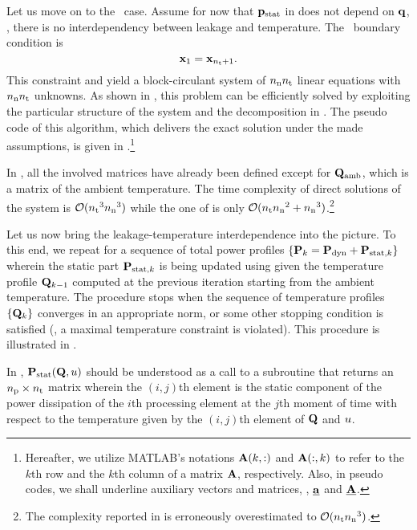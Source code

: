 Let us move on to the \dss\ case.
Assume for now that $\mathbf{p}_{\text{stat}}$ in  does not depend on $\mathbf{q}$, \ie, there is no interdependency between leakage and temperature.
The \dss\ boundary condition is
\[
  \mathbf{x}_1 = \mathbf{x}_{{n_\text{t}} + 1}.
\]
This constraint and  yield a block-circulant system of ${n_\text{n}} {n_\text{t}}$ linear equations with ${n_\text{n}} {n_\text{t}}$ unknowns.
As shown in \cite{ukhov2012}, this problem can be efficiently solved by exploiting the particular structure of the system and the decomposition in .
The pseudo code of this algorithm, which delivers the exact solution under the made assumptions, is given in .\footnote{Hereafter, we utilize MATLAB's notations $\mathbf{A}(k, :)$ and $\mathbf{A}(:, k)$ to refer to the $k$th row and the $k$th column of a matrix $\mathbf{A}$, respectively.
Also, in pseudo codes, we shall underline auxiliary vectors and matrices, \eg, $\underline{\mathbf{a}}$ and $\underline{\mathbf{A}}$.}


In , all the involved matrices have already been defined except for $\mathbf{Q}_{\text{amb}}$, which is a matrix of the ambient temperature.
The time complexity of direct solutions of the system is $\mathcal{O}({n_\text{t}}^3 {n_\text{n}}^3)$ while the one of  is only $\mathcal{O}({n_\text{t}} {n_\text{n}}^2 + {n_\text{n}}^3)$.\footnote{The complexity reported in \cite{ukhov2012} is erroneously overestimated to $\mathcal{O}({n_\text{t}} {n_\text{n}}^3)$.}

Let us now bring the leakage-temperature interdependence into the picture.
To this end, we repeat  for a sequence of total power profiles $\{ \mathbf{P}_k = \mathbf{P}_{\text{dyn}} + \mathbf{P}_{\text{stat}, k} \}$ wherein the static part $\mathbf{P}_{\text{stat}, k}$ is being updated using  given the temperature profile $\mathbf{Q}_{k - 1}$ computed at the previous iteration starting from the ambient temperature.
The procedure stops when the sequence of temperature profiles $\{ \mathbf{Q}_k \}$ converges in an appropriate norm, or some other stopping condition is satisfied (\eg, a maximal temperature constraint is violated).
This procedure is illustrated in .


In , $\mathbf{P}_{\text{stat}}(\mathbf{Q}, u)$ should be understood as a call to a subroutine that returns an ${n_\text{p}} \times {n_\text{t}}$ matrix wherein the $(i, j)$th element is the static component of the power dissipation of the $i$th processing element at the $j$th moment of time with respect to the temperature given by the $(i, j)$th element of $\mathbf{Q}$ and $u$.

